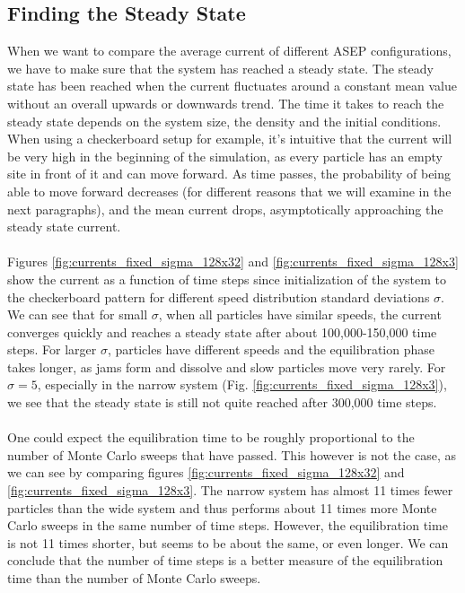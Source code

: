\subsection{Finding the Steady State}

When we want to compare the average current of different ASEP configurations, we have to make sure that the system has reached a steady state. The steady state has been reached when the current fluctuates around a constant mean value without an overall upwards or downwards trend. The time it takes to reach the steady state depends on the system size, the density and the initial conditions. When using a checkerboard setup for example, it's intuitive that the current will be very high in the beginning of the simulation, as every particle has an empty site in front of it and can move forward. As time passes, the probability of being able to move forward decreases (for different reasons that we will examine in the next paragraphs), and the mean current drops, asymptotically approaching the steady state current.
\\
\\
Figures \ref{fig:currents_fixed_sigma_128x32} and \ref{fig:currents_fixed_sigma_128x3} show the current as a function of time steps since initialization of the system to the checkerboard pattern for different speed distribution standard deviations $\sigma$. We can see that for small $\sigma$, when all particles have similar speeds, the current converges quickly and reaches a steady state after about 100,000-150,000 time steps. For larger $\sigma$, particles have different speeds and the equilibration phase takes longer, as jams form and dissolve and slow particles move very rarely. For $\sigma = 5$, especially in the narrow system (Fig. \ref{fig:currents_fixed_sigma_128x3}), we see that the steady state is still not quite reached after 300,000 time steps. 
\\
\\
One could expect the equilibration time to be roughly proportional to the number of Monte Carlo sweeps that have passed. This however is not the case, as we can see by comparing figures \ref{fig:currents_fixed_sigma_128x32} and \ref{fig:currents_fixed_sigma_128x3}. The narrow system has almost 11 times fewer particles than the wide system and thus performs about 11 times more Monte Carlo sweeps in the same number of time steps. However, the equilibration time is not 11 times shorter, but seems to be about the same, or even longer. We can conclude that the number of time steps is a better measure of the equilibration time than the number of Monte Carlo sweeps.
